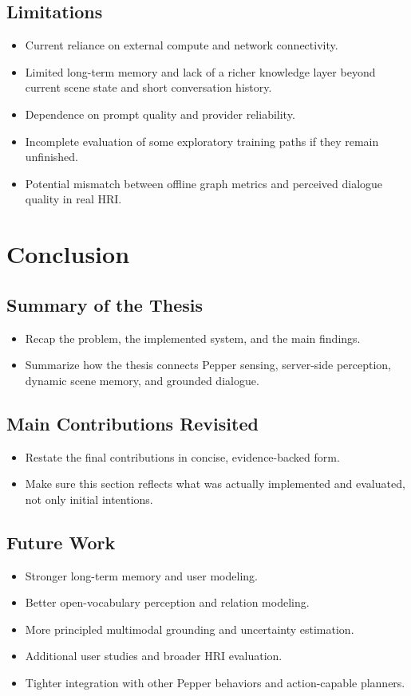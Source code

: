 \documentclass[
  digital,     %
  oneside,     %
  nosansbold,  %
  nocolorbold, %
  lof,         %
  lot,         %
]{fithesis4}
\begin{document}
\section{Limitations}
\begin{itemize}
    \item Current reliance on external compute and network connectivity.
    \item Limited long-term memory and lack of a richer knowledge layer beyond current scene state and short conversation history.
    \item Dependence on prompt quality and provider reliability.
    \item Incomplete evaluation of some exploratory training paths if they remain unfinished.
    \item Potential mismatch between offline graph metrics and perceived dialogue quality in real HRI.
\end{itemize}

\chapter{Conclusion}

\section{Summary of the Thesis}
\begin{itemize}
    \item Recap the problem, the implemented system, and the main findings.
    \item Summarize how the thesis connects Pepper sensing, server-side perception, dynamic scene memory, and grounded dialogue.
\end{itemize}

\section{Main Contributions Revisited}
\begin{itemize}
    \item Restate the final contributions in concise, evidence-backed form.
    \item Make sure this section reflects what was actually implemented and evaluated, not only initial intentions.
\end{itemize}

\section{Future Work}
\begin{itemize}
    \item Stronger long-term memory and user modeling.
    \item Better open-vocabulary perception and relation modeling.
    \item More principled multimodal grounding and uncertainty estimation.
    \item Additional user studies and broader HRI evaluation.
    \item Tighter integration with other Pepper behaviors and action-capable planners.
\end{itemize}

\nocite{*}
\printbibliography[heading=bibintoc]
\end{document}
